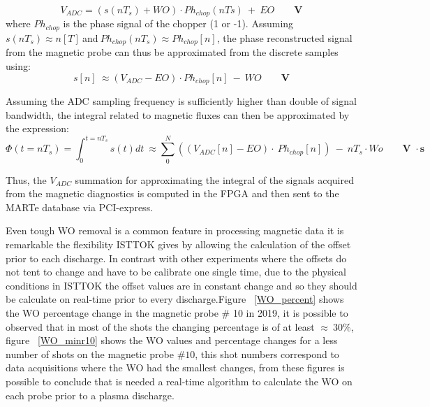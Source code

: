 \begin{equation}
V_{ADC}=(s(nT_s)+WO)\cdot Ph_{chop}(nTs)~+~EO \qquad \textbf{V}
\end{equation}
where $Ph_{chop}$ is the phase signal of the chopper (1 or -1). Assuming $s(nT_s)\approx n[T]~$and$~Ph_{chop}(nT_s)\approx Ph_{chop}[n] $, the phase reconstructed signal from the magnetic probe can thus be approximated from the discrete samples using:
\begin{equation}
s[n]~\approx (V_{ADC}-EO) \cdot Ph_{chop}[n]~-~WO\qquad \textbf{V}
\end{equation}

Assuming the ADC sampling frequency is sufficiently higher than double of signal bandwidth, the integral related to magnetic fluxes can then be approximated by the expression:
\smallskip
 \begin{equation}
 	\Phi (t=nT_s)=\int_{0}^{t=nT_s} s(t)dt~\approx \sum_{0}^{N} ((V_{ADC}[n]-EO)\cdot ~ Ph_{chop}[n])~-~nT_s\cdot Wo\qquad \textbf{V } \cdot \textbf{s}
 \end{equation}

Thus, the $V_{ADC}$ summation for approximating the integral of the signals acquired from the magnetic diagnostics is computed  in the FPGA and then sent to the MARTe database via PCI-express.\smallskip
 

Even tough  WO removal is a common feature in processing magnetic data it is remarkable the flexibility ISTTOK gives by allowing the calculation of the offset prior to each discharge. In contrast with other experiments where the offsets do not tent to change and have to be calibrate one single time, due to the physical conditions in ISTTOK the offset values are in constant change and so they should be calculate on real-time prior to  every discharge.Figure  ~\ref{WO_percent} shows the WO percentage change in the magnetic probe $\#$ 10  in 2019, it is possible to observed that in most of the shots the changing percentage is of at least $\approx~30\%$, figure   ~\ref{WO_minr10} shows the WO values and percentage changes for a less number of shots on the magnetic probe $\#10$, this shot numbers correspond to data acquisitions where the WO had the smallest changes, from these figures is possible to conclude that is needed a real-time algorithm to calculate the WO on each probe prior to a plasma discharge. \smallskip

